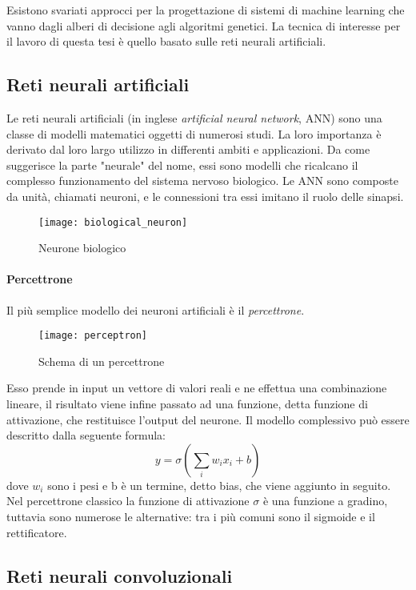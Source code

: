 Esistono svariati approcci per la progettazione di sistemi di machine learning che vanno dagli alberi di decisione agli algoritmi genetici. La tecnica di interesse per il lavoro di questa tesi è quello basato sulle reti neurali artificiali.

\subsection{Reti neurali artificiali}
Le reti neurali artificiali (in inglese \textit{artificial neural network}, ANN) sono una classe di modelli matematici oggetti di numerosi studi. La loro importanza è derivato dal loro largo utilizzo in differenti ambiti e applicazioni. Da come suggerisce la parte "neurale" del nome, essi sono modelli che ricalcano il complesso funzionamento del sistema nervoso biologico. Le ANN sono composte da unità, chiamati neuroni, e le connessioni tra essi imitano il ruolo delle sinapsi.
\begin{figure}[ht]
    \centering
    \texttt{[image: biological\_neuron]}
    \caption[Neurone biologico]{Neurone biologico}
    \label{biological_neuron}
\end{figure}
\paragraph{Percettrone}
Il più semplice modello dei neuroni artificiali è il \textit{percettrone}. 
\begin{figure}[ht]
    \centering
    \texttt{[image: perceptron]}
    \caption[Percettrone]{Schema di un percettrone}
    \label{biological_neuron}
\end{figure}
Esso prende in input un vettore di valori reali e ne effettua una combinazione lineare, il risultato viene infine passato ad una funzione, detta funzione di attivazione, che restituisce l'output del neurone. Il modello complessivo può essere descritto dalla seguente formula: 
$$y=\sigma(\sum_{i} w_{i}x_{i}+b)$$
dove $w_{i}$ sono i pesi e b è un termine, detto bias, che viene aggiunto in seguito. Nel percettrone classico la funzione di attivazione $\sigma$ è una funzione a gradino, tuttavia sono numerose le alternative: tra i più comuni sono il sigmoide e il rettificatore.

\subsection{Reti neurali convoluzionali}